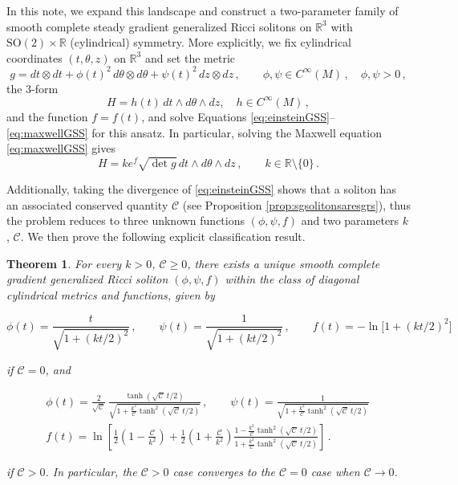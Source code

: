 \documentclass[12pt,a4paper,reqno]{amsart}
\theoremstyle{plain}
\newtheorem{theorem}{Theorem}[section]
\theoremstyle{remark}
\numberwithin{equation}{section}
\newcommand{\cC}{\mathcal{C}}
\newcommand{\SO}{\mathrm{SO}}
\newcommand{\R}{\mathbb{R}}
\begin{document}
In this note, we expand this landscape and construct a two-parameter family of smooth complete steady gradient generalized Ricci solitons on $\R^3$ with $\SO(2)\times \R$ (cylindrical) symmetry. More explicitly, we fix cylindrical coordinates $(t,\theta,z)$ on $\R^3$ and set the metric
\begin{equation}\label{eq:metric}
g = dt \otimes dt + \phi(t)^2 \,d\theta \otimes d\theta + \psi(t)^2 \,dz \otimes dz \,, \qquad \phi, \psi \in C^\infty(M) \,, \quad \phi, \psi > 0 \,,
\end{equation}
the 3-form
\begin{equation}\label{eq:H}
H = h(t) \,dt \wedge d\theta \wedge dz, \quad h \in C^\infty(M) \,, 
\end{equation}
and the function $f=f(t)$, and solve Equations \eqref{eq:einsteinGSS}--\eqref{eq:maxwellGSS} for this ansatz. In particular, solving the Maxwell equation \eqref{eq:maxwellGSS} gives
\begin{equation*}
H = k e^f \sqrt{\det g} \, dt \wedge d\theta \wedge dz \,, \qquad k \in \R\setminus \{0\} \,.
\end{equation*}

Additionally, taking the divergence of \eqref{eq:einsteinGSS} shows that a soliton has an associated conserved quantity $\cC$ (see Proposition \ref{prop:sgsolitonsaresgrs}), thus the problem reduces to three unknown functions $(\phi,\psi,f)$ and two parameters $k$, $\cC$. We then prove the following explicit classification result.

\begin{theorem}\label{thm:main}
For every $k>0$, $\cC\ge0$, there exists a unique smooth complete gradient generalized Ricci soliton $(\phi, \psi, f)$ within the class of diagonal cylindrical metrics and functions, given by

\begin{equation*}
\phi(t) = \frac{t}{\sqrt{1 + (kt/2)^2}} \,, \qquad 
\psi(t) = \frac{1}{\sqrt{1 + (kt/2)^2}} \,, \qquad 
f(t) = - \ln\big[ 1 + (kt/2)^2 \big]
\end{equation*}

if $\cC=0$, and

\begin{equation*}
\begin{gathered}
\phi(t) = \frac{2}{\sqrt{\cC}}\,\frac{\tanh(\sqrt{\cC}\,t/2)}{\sqrt{1 + \frac{k^{2}}{\cC}\tanh^{2}(\sqrt{\cC}\,t/2)}} \,, \qquad \psi(t) = \frac{1}{\sqrt{1 + \frac{k^{2}}{\cC}\tanh^{2}(\sqrt{\cC}\,t/2)}} \, \\[6pt]
f(t) = \ln\left[\frac{1}{2}\left(1-\frac{\cC}{k^{2}}\right) + \frac{1}{2}\left(1+\frac{\cC}{k^{2}}\right)\frac{1 - \frac{k^{2}}{\cC}\tanh^{2}(\sqrt{\cC}\,t/2)}{1 + \frac{k^{2}}{\cC}\tanh^{2}(\sqrt{\cC}\,t/2)}
\right] \,.
\end{gathered}
\end{equation*}

if $\cC>0$. In particular, the $\cC>0$ case converges to the $\cC=0$ case when $\cC\to 0$.
\end{theorem}
\end{document}
